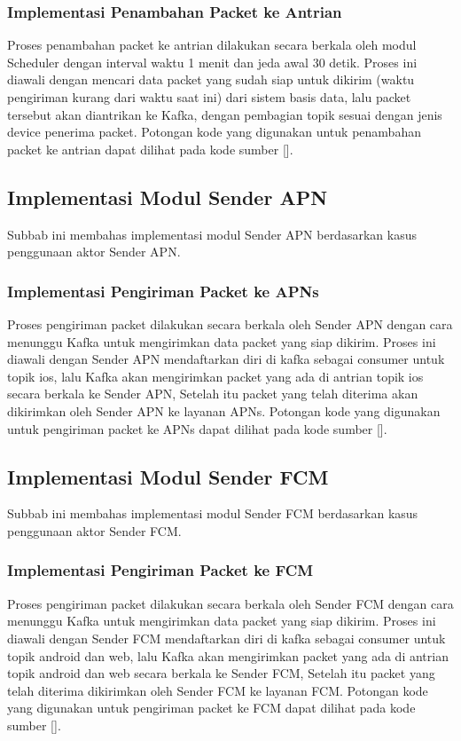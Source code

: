 \subsubsection{Implementasi Penambahan Packet ke Antrian}
\par Proses penambahan packet ke antrian dilakukan secara berkala oleh modul Scheduler dengan interval waktu 1 menit
dan jeda awal 30 detik.
Proses ini diawali dengan mencari data packet yang sudah siap untuk dikirim (waktu pengiriman kurang dari waktu saat
ini) dari sistem basis data,
lalu packet tersebut akan diantrikan ke Kafka, dengan pembagian topik sesuai dengan jenis device penerima packet.
Potongan kode yang digunakan untuk penambahan packet ke antrian dapat dilihat pada kode sumber [].

\subsection{Implementasi Modul Sender APN}
\par Subbab ini membahas implementasi modul Sender APN berdasarkan kasus penggunaan aktor Sender APN.

\subsubsection{Implementasi Pengiriman Packet ke APNs}
\par Proses pengiriman packet dilakukan secara berkala oleh Sender APN dengan cara menunggu Kafka untuk mengirimkan
data packet yang siap dikirim.
Proses ini diawali dengan Sender APN mendaftarkan diri di kafka sebagai consumer untuk topik ios,
lalu Kafka akan mengirimkan packet yang ada di antrian topik ios secara berkala ke Sender APN,
Setelah itu packet yang telah diterima akan dikirimkan oleh Sender APN ke layanan APNs.
Potongan kode yang digunakan untuk pengiriman packet ke APNs dapat dilihat pada kode sumber [].

\subsection{Implementasi Modul Sender FCM}
\par Subbab ini membahas implementasi modul Sender FCM berdasarkan kasus penggunaan aktor Sender FCM.

\subsubsection{Implementasi Pengiriman Packet ke FCM}
\par Proses pengiriman packet dilakukan secara berkala oleh Sender FCM dengan cara menunggu Kafka untuk mengirimkan
data packet yang siap dikirim.
Proses ini diawali dengan Sender FCM mendaftarkan diri di kafka sebagai consumer untuk topik android dan web,
lalu Kafka akan mengirimkan packet yang ada di antrian topik android dan web secara berkala ke Sender FCM,
Setelah itu packet yang telah diterima dikirimkan oleh Sender FCM ke layanan FCM.
Potongan kode yang digunakan untuk pengiriman packet ke FCM dapat dilihat pada kode sumber [].
%
